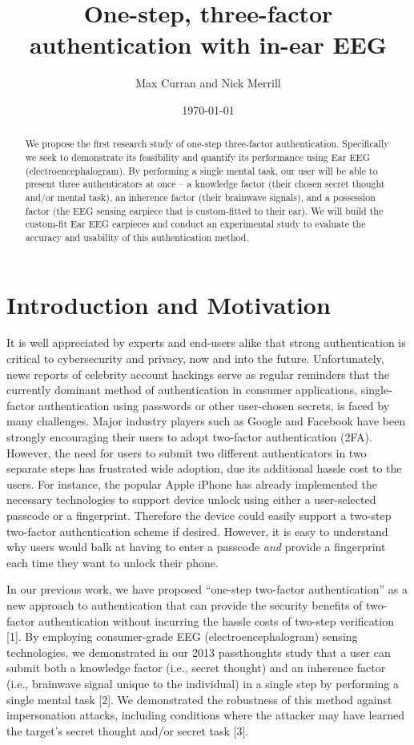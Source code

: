\documentclass[11pt]{article}
\author{Max Curran and Nick Merrill}
\date{\today}
\title{One-step, three-factor authentication with in-ear EEG}
\begin{document}
\maketitle
\begin{abstract}
We propose the first research study of one-step three-factor authentication.
Specifically we seek to demonstrate its feasibility and quantify its performance
using Ear EEG (electroencephalogram). By performing a single mental task, our
user will be able to present three authenticators at once – a knowledge factor
(their chosen secret thought and/or mental task), an inherence factor (their
brainwave signals), and a possession factor (the EEG sensing earpiece that is
custom-fitted to their ear). We will build the custom-fit Ear EEG earpieces and
conduct an experimental study to evaluate the accuracy and usability of this
authentication method.
\end{abstract}
\section{Introduction and Motivation}
\label{sec:orgd88076b}

It is well appreciated by experts and end-users alike that strong authentication is
critical to cybersecurity and privacy, now and into the future. Unfortunately,
news reports of celebrity account hackings serve as regular reminders that
the currently dominant method of authentication in consumer applications, 
single-factor authentication using passwords or other user-chosen secrets, 
is faced by many challenges. Major industry players such as Google and
Facebook have been strongly encouraging their users to adopt two-factor
authentication (2FA). However, the need for users to submit two different 
authenticators in two separate steps has frustrated wide adoption, 
due its additional hassle cost to the users. For instance, the popular Apple
iPhone has already implemented the necessary technologies to support device
unlock using either a user-selected passcode or a fingerprint. Therefore the
device could easily support a two-step two-factor authentication scheme if
desired. However, it is easy to understand why users would balk at having to
enter a passcode \emph{and} provide a fingerprint each time they want to unlock their phone.

In our previous work, we have proposed “one-step two-factor authentication” as a
new approach to authentication that can provide the security benefits of two-
factor authentication without incurring the hassle costs of two-step verification [1].
By employing consumer-grade EEG (electroencephalogram) sensing
technologies, we demonstrated in our 2013 passthoughts study that a user can
submit both a knowledge factor (i.e., secret thought) and an inherence factor
(i.e., brainwave signal unique to the individual) in a single step by performing a
single mental task [2]. We demonstrated the robustness of this method against
impersonation attacks, including conditions where the attacker may have learned
the target’s secret thought and/or secret task [3].
\end{document}
